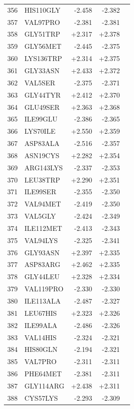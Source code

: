 \begin{longtable}{r l r r c}
356 & HIS110GLY & -2.458 & -2.382 &  \\
357 & VAL97PRO & -2.381 & -2.381 &  \\
358 & GLY51TRP & +2.317 & +2.378 &  \\
359 & GLY56MET & -2.445 & -2.375 &  \\
360 & LYS136TRP & +2.314 & +2.375 &  \\
361 & GLY33ASN & +2.433 & +2.372 &  \\
362 & VAL5SER & -2.375 & -2.371 &  \\
363 & GLY44TYR & +2.412 & +2.370 &  \\
364 & GLU49SER & +2.363 & +2.368 &  \\
365 & ILE99GLU & -2.386 & -2.365 &  \\
366 & LYS70ILE & +2.550 & +2.359 &  \\
367 & ASP83ALA & -2.516 & -2.357 &  \\
368 & ASN19CYS & +2.282 & +2.354 &  \\
369 & ARG143LYS & -2.337 & -2.353 &  \\
370 & LEU38TRP & +2.290 & +2.351 &  \\
371 & ILE99SER & -2.355 & -2.350 &  \\
372 & VAL94MET & -2.419 & -2.350 &  \\
373 & VAL5GLY & -2.424 & -2.349 &  \\
374 & ILE112MET & -2.413 & -2.343 &  \\
375 & VAL94LYS & -2.325 & -2.341 &  \\
376 & GLY93ASN & +2.397 & +2.335 &  \\
377 & ASP83ARG & +2.462 & +2.335 &  \\
378 & GLY44LEU & +2.328 & +2.334 &  \\
379 & VAL119PRO & -2.330 & -2.330 &  \\
380 & ILE113ALA & -2.487 & -2.327 &  \\
381 & LEU67HIS & +2.323 & +2.326 &  \\
382 & ILE99ALA & -2.486 & -2.326 &  \\
383 & VAL14HIS & -2.324 & -2.321 &  \\
384 & HIS80GLN & -2.194 & -2.321 &  \\
385 & VAL7PRO & -2.311 & -2.311 &  \\
386 & PHE64MET & -2.381 & -2.311 &  \\
387 & GLY114ARG & +2.438 & +2.311 &  \\
388 & CYS57LYS & -2.293 & -2.309 &  \\

\end{longtable}
